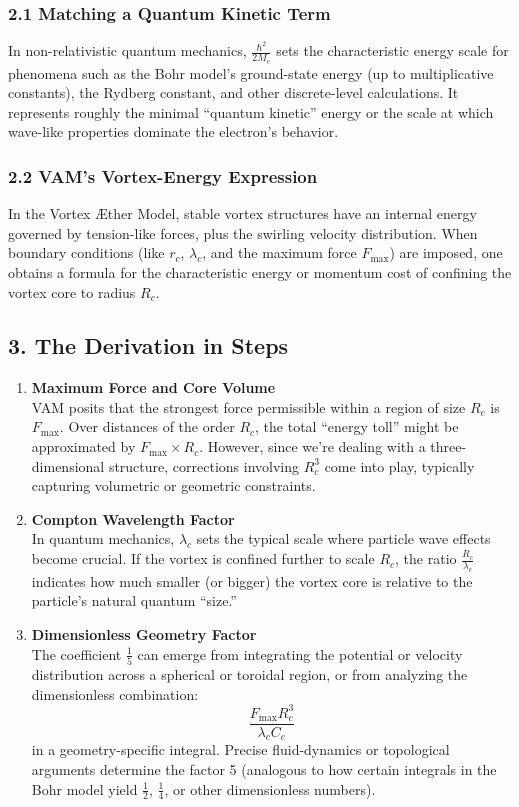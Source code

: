 \subsubsection*{2.1 Matching a Quantum Kinetic Term}
In non-relativistic quantum mechanics, \(\frac{\hbar^2}{2M_e}\) sets the characteristic energy scale for phenomena such as the Bohr model’s ground-state energy (up to multiplicative constants), the Rydberg constant, and other discrete-level calculations. It represents roughly the minimal “quantum kinetic” energy or the scale at which wave-like properties dominate the electron’s behavior.

\subsubsection*{2.2 VAM’s Vortex-Energy Expression}
In the Vortex Æther Model, stable vortex structures have an internal energy governed by tension-like forces, plus the swirling velocity distribution. When boundary conditions (like \(r_c\), \(\lambda_c\), and the maximum force \(F_{\max}\)) are imposed, one obtains a formula for the characteristic energy or momentum cost of confining the vortex core to radius \(R_c\).

\subsection*{3. The Derivation in Steps}

\begin{enumerate}
    \item \textbf{Maximum Force and Core Volume} \\
    VAM posits that the strongest force permissible within a region of size \(R_c\) is \(F_{\max}\). Over distances of the order \(R_c\), the total “energy toll” might be approximated by \(F_{\max} \times R_c\). However, since we’re dealing with a three-dimensional structure, corrections involving \(R_c^3\) come into play, typically capturing volumetric or geometric constraints.
    \item \textbf{Compton Wavelength Factor} \\
    In quantum mechanics, \(\lambda_c\) sets the typical scale where particle wave effects become crucial. If the vortex is confined further to scale \(R_c\), the ratio \(\tfrac{R_c}{\lambda_c}\) indicates how much smaller (or bigger) the vortex core is relative to the particle’s natural quantum “size.”
    \item \textbf{Dimensionless Geometry Factor} \\
    The coefficient \(\frac{1}{5}\) can emerge from integrating the potential or velocity distribution across a spherical or toroidal region, or from analyzing the dimensionless combination:
    \[
        \frac{F_{\max} R_c^3}{\lambda_c C_e}
    \]
    in a geometry-specific integral. Precise fluid-dynamics or topological arguments determine the factor 5 (analogous to how certain integrals in the Bohr model yield \(\tfrac12\), \(\tfrac14\), or other dimensionless numbers).
\end{enumerate}

